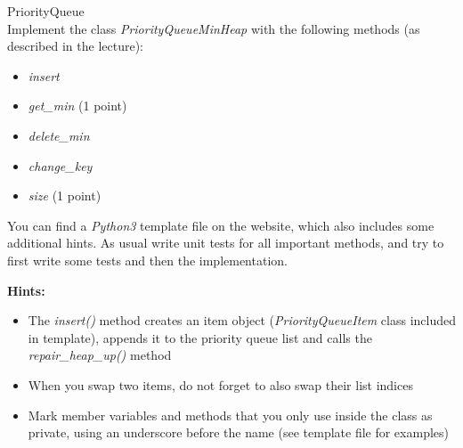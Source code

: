  PriorityQueue \\
Implement the class \textit{PriorityQueueMinHeap} with the following methods
(as described in the lecture):
\begin{itemize}
  \item\textit{insert} 
  \item\textit{get\_min} (1 point)
  \item\textit{delete\_min} 
  \item\textit{change\_key} 
  \item\textit{size} (1 point)
\end{itemize}

You can find a \emph{Python3} template file on the website, which also includes some additional hints. 
As usual write unit tests for all important methods, and try to first write some tests 
and then the implementation.

\textbf{Hints:}
\begin{itemize}
\item The \emph{insert()} method creates an item object (\emph{PriorityQueueItem} class included in template), appends it to the priority queue list and calls the \emph{repair\_heap\_up()} method
\item When you swap two items, do not forget to also swap their list indices
\item Mark member variables and methods that you only use inside the class as private, using an underscore before the name (see template file for examples)
\end{itemize}
